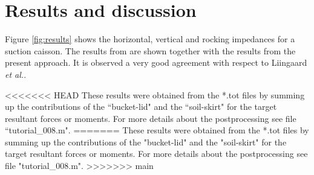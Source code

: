 \documentclass[a4]{article}
\begin{document}
\section{Results and discussion}

Figure \ref{fig:results} shows the horizontal, vertical and rocking impedances for a suction caisson. The results from \cite{liingaard} are shown together with the results from the present approach. It is observed a very good agreement with respect to Liingaard \textit{et al.}. 

<<<<<<< HEAD
These results were obtained from the *.tot files by summing up the contributions of the ``bucket-lid" and the ``soil-skirt" for the target resultant forces or moments. For more details about the postprocessing see file ``tutorial\_008.m".
=======
These results were obtained from the *.tot files by summing up the contributions of the "bucket-lid" and the "soil-skirt" for the target resultant forces or moments. For more details about the postprocessing see file "tutorial\_008.m".
>>>>>>> main
\end{document}
